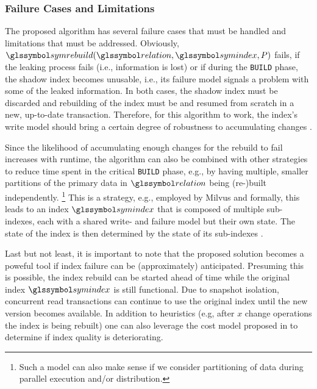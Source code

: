 \subsubsection{Failure Cases and Limitations}

The proposed algorithm has several failure cases that must be handled and limitations that must be addressed. Obviously, $\symrebuild(\relation,\symindex,P)$ fails, if the leaking process fails (i.e., information is lost) or if during the \texttt{BUILD} phase, the shadow index becomes unusable, i.e., its failure model signals a problem with some of the leaked information. In both cases, the shadow index must be discarded and rebuilding of the index must be and resumed from scratch in a new, up-to-date transaction. Therefore, for this algorithm to work, the index's write model should bring a certain degree of robustness to accumulating changes . 

Since the likelihood of accumulating enough changes for the rebuild to fail increases with runtime, the algorithm can also be combined with other strategies to reduce time spent in the critical \texttt{BUILD} phase, e.g., by having multiple, smaller partitions of the primary data in $\relation$ being (re-)built independently. \footnote{Such a model can also make sense if we consider partitioning of data during parallel execution and/or distribution.} This is a strategy, e.g., employed by Milvus \cite{Wang:2021Milvus} and formally, this leads to an index $\symindex$ that is composed of multiple sub-indexes, each with a shared write- and failure model but their own state. The state of the index is then determined by the state of its sub-indexes .

Last but not least, it is important to note that the proposed solution becomes a poweful tool if index failure can be (approximately) anticipated. Presuming this is possible, the index rebuild can be started ahead of time while the original index $\symindex$ is still functional. Due to snapshot isolation, concurrent read transactions can continue to use the original index until the new version becomes available. In addition to heuristics (e.g, after $x$ change operations the index is being rebuilt) one can also leverage the cost model proposed in  to determine if index quality is deteriorating.

